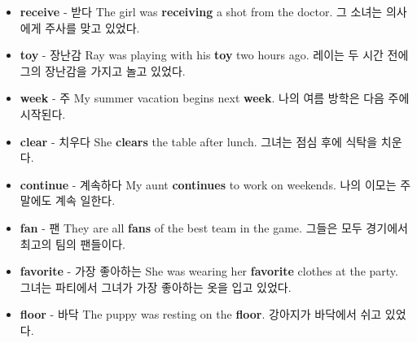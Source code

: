 \documentclass{article}
\begin{document}
\begin{addmargin}[1em]{1em}
\begin{itemize}
        \item \fontsize{12pt}{14pt}\selectfont \textbf{receive} - 받다 \newline
        The girl was \textbf{receiving} a shot from the doctor. \newline
        그 소녀는 의사에게 주사를 맞고 있었다.

        \item \fontsize{12pt}{14pt}\selectfont \textbf{toy} - 장난감 \newline
        Ray was playing with his \textbf{toy} two hours ago. \newline
        레이는 두 시간 전에 그의 장난감을 가지고 놀고 있었다.

        \item \fontsize{12pt}{14pt}\selectfont \textbf{week} - 주 \newline
        My summer vacation begins next \textbf{week}. \newline
        나의 여름 방학은 다음 주에 시작된다.

        \item \fontsize{12pt}{14pt}\selectfont \textbf{clear} - 치우다 \newline
        She \textbf{clears} the table after lunch. \newline
        그녀는 점심 후에 식탁을 치운다.

        \item \fontsize{12pt}{14pt}\selectfont \textbf{continue} - 계속하다 \newline
        My aunt \textbf{continues} to work on weekends. \newline
        나의 이모는 주말에도 계속 일한다.

        \item \fontsize{12pt}{14pt}\selectfont \textbf{fan} - 팬 \newline
        They are all \textbf{fans} of the best team in the game. \newline
        그들은 모두 경기에서 최고의 팀의 팬들이다.

        \item \fontsize{12pt}{14pt}\selectfont \textbf{favorite} - 가장 좋아하는 \newline
        She was wearing her \textbf{favorite} clothes at the party. \newline
        그녀는 파티에서 그녀가 가장 좋아하는 옷을 입고 있었다.

        \item \fontsize{12pt}{14pt}\selectfont \textbf{floor} - 바닥 \newline
        The puppy was resting on the \textbf{floor}. \newline
        강아지가 바닥에서 쉬고 있었다.


\end{itemize}
\end{addmargin}
\end{document}
